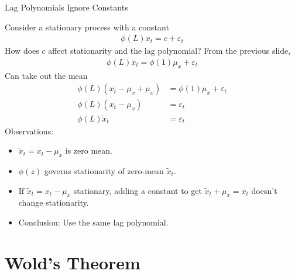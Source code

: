 \documentclass[handout]{beamer}
\begin{document}
\begin{frame}[shrink]{Lag Polynomials Ignore Constants}

Consider a stationary process with a constant
\begin{align*}
  \phi(L)x_t
  =
  c + \varepsilon_t
\end{align*}
How does $c$ affect stationarity and the lag polynomial?
\pause
From the previous slide,
\begin{align*}
  \phi(L)x_t
  =
  \phi(1)\mu_x + \varepsilon_t
\end{align*}
\pause
Can take out the mean
\begin{align*}
  \phi(L)(x_t-\mu_x+\mu_x)
  &=
  \phi(1)\mu_x + \varepsilon_t
  \\
  \phi(L)(x_t-\mu_x)
  &=
  \varepsilon_t
  \\
  \phi(L)\tilde{x}_t
  &=
  \varepsilon_t
\end{align*}
\pause
Observations:
\begin{itemize}
  \item $\tilde{x}_t=x_t-\mu_x$ is zero mean.
  \item $\phi(z)$ governs stationarity of zero-mean
    $\tilde{x}_t$.
  \item If $\tilde{x}_t=x_t-\mu_x$ stationary, adding a constant to
    get $\tilde{x}_t+\mu_x=x_t$ doesn't change stationarity.
  \item Conclusion: Use the same lag polynomial.
\end{itemize}
\end{frame}



\section{Wold's Theorem}
\end{document}
